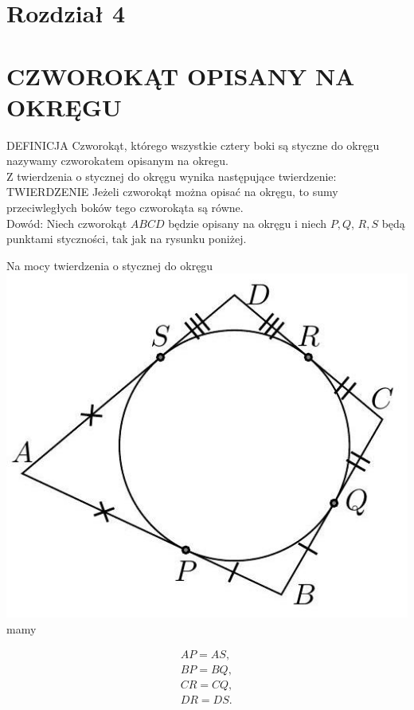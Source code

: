 \documentclass[10pt]{article}
\begin{document}
\section*{Rozdział 4}
\section*{CZWOROKĄT OPISANY NA OKRĘGU}
DEFINICJA Czworokąt, którego wszystkie cztery boki są styczne do okręgu nazywamy czworokatem opisanym na okregu.\\
Z twierdzenia o stycznej do okręgu wynika następujące twierdzenie:\\
TWIERDZENIE Jeżeli czworokąt można opisać na okręgu, to sumy przeciwległych boków tego czworokąta są równe.\\
Dowód: Niech czworokąt \(A B C D\) będzie opisany na okręgu i niech \(P, Q\), \(R, S\) będą punktami styczności, tak jak na rysunku poniżej.

Na mocy twierdzenia o stycznej do okręgu\\
\includegraphics[max width=\textwidth, center]{2024_11_21_e9b4faa005d5be2cc318g-048}\\
mamy

\[
\begin{gathered}
A P=A S, \\
B P=B Q, \\
C R=C Q, \\
D R=D S .
\end{gathered}
\]
\end{document}
